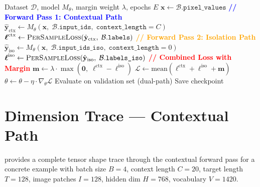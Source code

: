 \documentclass[11pt, a4paper]{report}
\begin{document}
\begin{algorithm}[t]
\caption{Context-Aware Dual-Path Training}
\label{alg:training}
\begin{algorithmic}[1]
\Require Dataset $\mathcal{D}$, model $M_\theta$, margin weight $\lambda$, epochs $E$
    \State $\mathbf{x} \gets \mathcal{B}.\texttt{pixel\_values}$ 
    \Statex
    \State \textcolor{blue}{\textbf{// Forward Pass 1: Contextual Path}}
    \State $\hat{\mathbf{y}}_{\mathrm{ctx}} \gets M_\theta(\mathbf{x},\; \mathcal{B}.\texttt{input\_ids},\; \texttt{context\_length}{=}C)$
    \State $\boldsymbol\ell^{\mathrm{ctx}} \gets \textsc{PerSampleLoss}(\hat{\mathbf{y}}_{\mathrm{ctx}},\; \mathcal{B}.\texttt{labels})$ 
    \Statex
    \State \textcolor{orange}{\textbf{// Forward Pass 2: Isolation Path}}
    \State $\hat{\mathbf{y}}_{\mathrm{iso}} \gets M_\theta(\mathbf{x},\; \mathcal{B}.\texttt{input\_ids\_iso},\; \texttt{context\_length}{=}0)$
    \State $\boldsymbol\ell^{\mathrm{iso}} \gets \textsc{PerSampleLoss}(\hat{\mathbf{y}}_{\mathrm{iso}},\; \mathcal{B}.\texttt{labels\_iso})$ 
    \Statex
    \State \textcolor{red}{\textbf{// Combined Loss with Margin}}
    \State $\mathbf{m} \gets \lambda \cdot \max(\mathbf{0},\; \boldsymbol\ell^{\mathrm{ctx}} - \boldsymbol\ell^{\mathrm{iso}})$ 
    \State $\mathcal{L} \gets \mathrm{mean}(\boldsymbol\ell^{\mathrm{ctx}} + \boldsymbol\ell^{\mathrm{iso}} + \mathbf{m})$ 
    \Statex
    \State $\theta \gets \theta - \eta \cdot \nabla_\theta \mathcal{L}$ 
  \EndFor
  \State Evaluate on validation set (dual-path)
  \State Save checkpoint
\EndFor
\end{algorithmic}
\end{algorithm}


\section{Dimension Trace --- Contextual Path}
\label{sec:dim-trace-ctx}

 provides a complete tensor shape trace through the contextual forward pass for a concrete example with batch size $B{=}4$, context length $C{=}20$, target length $T{=}128$, image patches $I{=}128$, hidden dim $H{=}768$, vocabulary $V{=}1420$.
\end{document}
